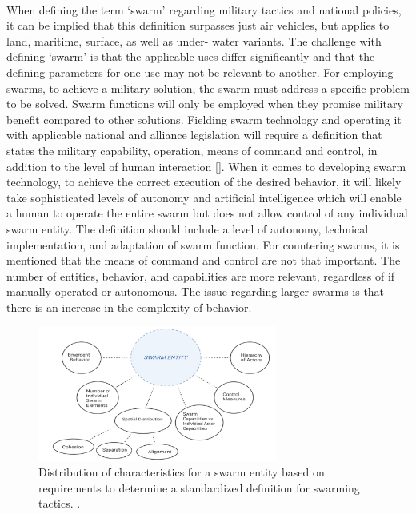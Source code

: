 \paragraph{} When defining the term ‘swarm’ regarding military tactics and national policies, it can be implied that this definition surpasses just air vehicles, but applies to land, maritime, surface, as well as under- water variants. The challenge with defining ‘swarm’ is that the applicable uses differ significantly and that the defining parameters for one use may not be relevant to another. For employing swarms, to achieve a military solution, the swarm must address a specific problem to be solved. Swarm functions will only be employed when they promise military benefit compared to other solutions. Fielding swarm technology and operating it with applicable national and alliance legislation will require a definition that states the military capability, operation, means of command and control, in addition to the level of human interaction []. When it comes to developing swarm technology, to achieve the correct execution of the desired behavior, it will likely take sophisticated levels of autonomy and artificial intelligence which will enable a human to operate the entire swarm but does not allow control of any individual swarm entity. The definition should include a level of autonomy, technical implementation, and adaptation of swarm function. For countering swarms, it is mentioned that the means of command and control are not that important. The number of entities, behavior, and capabilities are more relevant, regardless of if manually operated or autonomous. The issue regarding larger swarms is that there is an increase in the complexity of behavior. 
\begin{figure}[!h]
  \centering
  \includegraphics[width=0.7\textwidth]{Definition.jpg}
  \caption{Distribution of characteristics for a swarm entity based on requirements to determine a standardized definition for swarming tactics.  \cite{haury78}.}
  \label{fig:platforms}
\end{figure}
